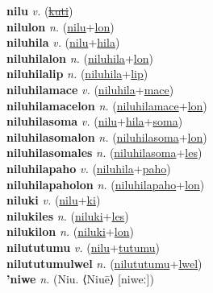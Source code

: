 \textbf{nilu} \textit{v.} (\hyperref[kuti]{\sout{kuti}})
 \label{nilu} \\
\textbf{nilulon} \textit{n.} (\hyperref[nilu]{nilu}+\hyperref[lon]{lon})
 \label{nilulon} \\
\textbf{niluhila} \textit{v.} (\hyperref[nilu]{nilu}+\hyperref[hila]{hila})
 \label{niluhila} \\
\textbf{niluhilalon} \textit{n.} (\hyperref[niluhila]{niluhila}+\hyperref[lon]{lon})
 \label{niluhilalon} \\
\textbf{niluhilalip} \textit{n.} (\hyperref[niluhila]{niluhila}+\hyperref[lip]{lip})
 \label{niluhilalip} \\
\textbf{niluhilamace} \textit{v.} (\hyperref[niluhila]{niluhila}+\hyperref[mace]{mace})
 \label{niluhilamace} \\
\textbf{niluhilamacelon} \textit{n.} (\hyperref[niluhilamace]{niluhilamace}+\hyperref[lon]{lon})
 \label{niluhilamacelon} \\
\textbf{niluhilasoma} \textit{v.} (\hyperref[nilu]{nilu}+\hyperref[hila]{hila}+\hyperref[soma]{soma})
 \label{niluhilasoma} \\
\textbf{niluhilasomalon} \textit{n.} (\hyperref[niluhilasoma]{niluhilasoma}+\hyperref[lon]{lon})
 \label{niluhilasomalon} \\
\textbf{niluhilasomales} \textit{n.} (\hyperref[niluhilasoma]{niluhilasoma}+\hyperref[les]{les})
 \label{niluhilasomales} \\
\textbf{niluhilapaho} \textit{v.} (\hyperref[niluhila]{niluhila}+\hyperref[paho]{paho})
 \label{niluhilapaho} \\
\textbf{niluhilapaholon} \textit{n.} (\hyperref[niluhilapaho]{niluhilapaho}+\hyperref[lon]{lon})
 \label{niluhilapaholon} \\
\textbf{niluki} \textit{v.} (\hyperref[nilu]{nilu}+\hyperref[ki]{ki})
 \label{niluki} \\
\textbf{nilukiles} \textit{n.} (\hyperref[niluki]{niluki}+\hyperref[les]{les})
 \label{nilukiles} \\
\textbf{nilukilon} \textit{n.} (\hyperref[niluki]{niluki}+\hyperref[lon]{lon})
 \label{nilukilon} \\
\textbf{nilututumu} \textit{v.} (\hyperref[nilu]{nilu}+\hyperref[tutumu]{tutumu})
 \label{nilututumu} \\
\textbf{nilututumulwel} \textit{n.} (\hyperref[nilututumu]{nilututumu}+\hyperref[lwel]{lwel})
 \label{nilututumulwel} \\
\textbf{'niwe} \textit{n.} (Niu. ⟨Niuē⟩ [niweː])
 \label{'niwe} \\
